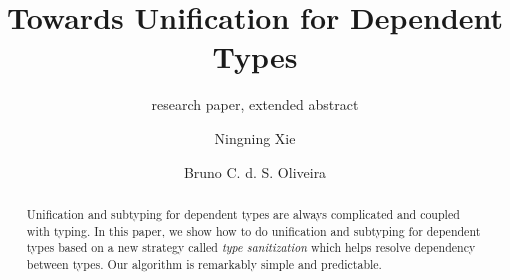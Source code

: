 \documentclass[oribibl, citeauthoryear]{llncs}
\author{Ningning Xie \and Bruno C. d. S. Oliveira}
\institute{The University of Hong Kong}
\begin{document}
\setlength{\pdfpageheight}{\paperheight}
\setlength{\pdfpagewidth}{\paperwidth}


\title{Towards Unification for Dependent Types}
\subtitle{research paper, extended abstract}
\maketitle

\begin{abstract}
  Unification and subtyping for dependent types are always complicated and
  coupled with typing.
  In this paper, we show how to do unification and subtyping for dependent types based
  on a new strategy called \textit{type sanitization} which helps
  resolve dependency between types. Our algorithm is remarkably simple and
  predictable.
\end{abstract}











\newpage
\appendix



\end{document}
